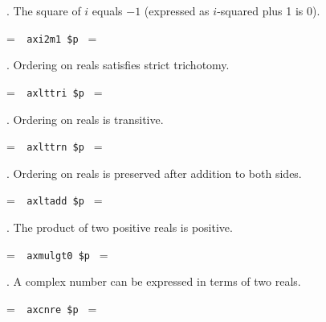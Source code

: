 . The square of $i$ equals $-1$ (expressed as $i$-squared plus 1 is
0).

\setbox\startprefix=\hbox{\tt \ \ axi2m1\ \$p\ }
\setbox\contprefix=\hbox{\tt \ \ \ \ \ \ \ \ \ \ \ \ }
\startm
\m{\vdash}\m{(}\m{(}\m{\cdot}\m{)}\m{+}\m{)}\m{=}
\endm

. Ordering on reals satisfies strict trichotomy.

\setbox\startprefix=\hbox{\tt \ \ axlttri\ \$p\ }
\setbox\contprefix=\hbox{\tt \ \ \ \ \ \ \ \ \ \ \ \ \ }
\startm
\m{\vdash}\m{(}\m{(}\m{\in}\m{\wedge}\m{\in}%
\m{)}\m{\rightarrow}\m{(}\m{<}\m{\leftrightarrow}\m{\lnot}\m{(}%
\m{=}\m{\vee}\m{<}\m{)}\m{)}\m{)}
\endm

. Ordering on reals is transitive.

\setbox\startprefix=\hbox{\tt \ \ axlttrn\ \$p\ }
\setbox\contprefix=\hbox{\tt \ \ \ \ \ \ \ \ \ \ \ \ \ }
\startm
\m{\vdash}\m{(}\m{(}\m{\in}\m{\wedge}\m{\in}%
\m{\wedge}\m{\in}\m{)}\m{\rightarrow}\m{(}\m{(}\m{<}%
\m{\wedge}\m{<}\m{)}\m{\rightarrow}\m{<}\m{)}\m{)}
\endm

. Ordering on reals is preserved after addition to both sides.

\setbox\startprefix=\hbox{\tt \ \ axltadd\ \$p\ }
\setbox\contprefix=\hbox{\tt \ \ \ \ \ \ \ \ \ \ \ \ \ }
\startm
\m{\vdash}\m{(}\m{(}\m{\in}\m{\wedge}\m{\in}%
\m{\wedge}\m{\in}\m{)}\m{\rightarrow}\m{(}\m{<}\m{%
\rightarrow}\m{(}\m{+}\m{)}\m{<}\m{(}\m{+}\m{)}\m{)}\m{)}
\endm

. The product of two positive reals is positive.

\setbox\startprefix=\hbox{\tt \ \ axmulgt0\ \$p\ }
\setbox\contprefix=\hbox{\tt \ \ \ \ \ \ \ \ \ \ \ \ \ \ }
\startm
\m{\vdash}\m{(}\m{(}\m{\in}\m{\wedge}\m{\in}%
\m{)}\m{\rightarrow}\m{(}\m{(}\m{<}\m{\wedge}%
\m{<}\m{)}\m{\rightarrow}\m{<}\m{(}\m{\cdot}\m{)}%
\m{)}\m{)}
\endm

. A complex number can be expressed in terms of two reals.

\setbox\startprefix=\hbox{\tt \ \ axcnre\ \$p\ }
\setbox\contprefix=\hbox{\tt \ \ \ \ \ \ \ \ \ \ \ \ }
\startm
\m{\vdash}\m{(}\m{\in}\m{\rightarrow}\m{\exists}\m{\in}%
\m{\exists}\m{\in}\m{=}\m{(}\m{+}\m{(}%
\m{\cdot}\m{)}\m{)}\m{)}
\endm

